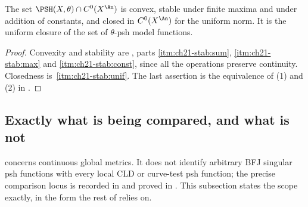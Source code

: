 \begin{corollary}
\label{cor:ch21-continuous-cone}
The set $\PSH(X,\theta)\cap C^0(X^{\An})$ is convex, stable under finite
maxima and under addition of constants, and closed in $C^0(X^{\An})$ for
the uniform norm.  It is the uniform closure of the set of $\theta$-psh
model functions.
\end{corollary}

\begin{proof}
Convexity and stability are
, parts \cref{itm:ch21-stab:sum},
\cref{itm:ch21-stab:max} and \cref{itm:ch21-stab:const}, since all the
operations preserve continuity.  Closedness is
\,\cref{itm:ch21-stab:unif}.  The last assertion is
the equivalence of (1) and (2) in .
\end{proof}

\subsection{Exactly what is being compared, and what is not}
\label{sec:ch21-cld-contrast}

 concerns continuous global metrics.  It
does not identify
arbitrary BFJ singular psh functions with every local CLD or curve-test psh
function; the precise comparison locus is recorded in
 and proved in
.  This subsection states the scope
exactly, in the form the rest of  relies on.

